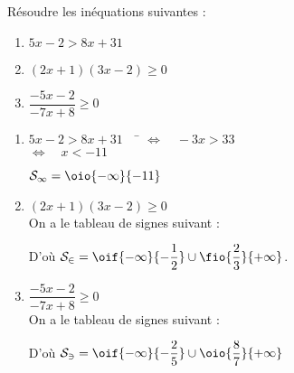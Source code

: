 \documentclass[a4paper,11pt,french]{article}
\begin{document}

\begin{exercice}[ (8 points)]
	Résoudre les inéquations suivantes :
	\begin{multicols}{3}
		\begin{enumerate}[\bfseries 1.]
			\item 	$5x-2> 8x+31$
			\item 	$(2x+1)(3x-2)\geqslant0$
			\item	$\dfrac{-5x-2}{-7x+8}\geqslant0$
		\end{enumerate}
	\end{multicols}
\end{exercice}

\begin{exercicecorrection}
	\begin{enumerate}[\bfseries 1.]
		\item 	\begin{tabbing}
			$5x-2> 8x+31 \quad$		\=	$\Leftrightarrow\quad -3x>33 $\\
			\>	$\Leftrightarrow\quad x<-11$
		\end{tabbing}
		$\mathcal{S_1}=\oio{-\infty}{-11}$
		\item 	$(2x+1)(3x-2)\geqslant0$\\[.5em]
		On a le tableau de signes suivant :
		\begin{center}
		\end{center}
		D'où $\mathcal{S_2}=\oif{-\infty}{-\dfrac{1}{2}}\cup\fio{\dfrac{2}{3}}{+\infty}$.
		\item	$\dfrac{-5x-2}{-7x+8}\geqslant0$\\[.5em]
		On a le tableau de signes suivant :
		\begin{center}
		\end{center}
	D'où $\mathcal{S_3}=\oif{-\infty}{-\dfrac{2}{5}}\cup\oio{\dfrac{8}{7}}{+\infty}$
	\end{enumerate}
\end{exercicecorrection}
\end{document}
